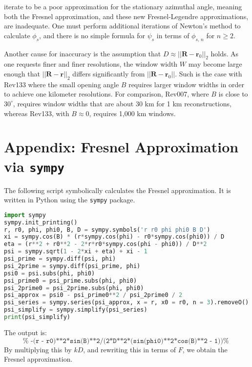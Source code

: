 \documentclass{article}
\theoremstyle{plain}
\begin{document}
        iterate to be a poor approximation for the stationary azimuthal angle,
        meaning both the Fresnel approximation, and these new Fresnel-Legendre
        approximations, are inadequate. One must perform additional iterations
        of Newton's method to calculate $\phi_{s}$, and there is no simple
        formula for $\psi_{s}$ in terms of $\phi_{s,\,n}$ for $n\geq{2}$.
        \par\hfill\par
        Another cause for inaccuracy is the assumption that
        $D\approx||\mathbf{R}-\mathbf{r}_{0}||_{2}$ holds. As one requests
        finer and finer resolutions, the window width $W$ may become large
        enough that $||\mathbf{R}-\mathbf{r}||_{2}$ differs significantly from
        $||\mathbf{R}-\mathbf{r}_{0}||$. Such is the case with Rev133 where the
        small opening angle $B$ requires larger window widths in order to
        achieve one kilometer resolutions. For comparison, Rev007, where $B$ is
        close to $30^{\circ}$, requires window widths that are about 30 km for
        1 km reconstructions, whereas Rev133, with $B\approx{0}$, requires
        1,000 km windows.
    \setcounter{secnumdepth}{0}
    \section{Appendix: Fresnel Approximation via \texttt{sympy}}
        The following script symbolically calculates the Fresnel approximation.
        It is written in Python using the \texttt{sympy} package.
        \begin{lstlisting}[language = Python]
import sympy
sympy.init_printing()
r, r0, phi, phi0, B, D = sympy.symbols('r r0 phi phi0 B D')
xi = sympy.cos(B) * (r*sympy.cos(phi) - r0*sympy.cos(phi0)) / D
eta = (r**2 + r0**2 - 2*r*r0*sympy.cos(phi - phi0)) / D**2
psi = sympy.sqrt(1 - 2*xi + eta) + xi - 1
psi_prime = sympy.diff(psi, phi)
psi_2prime = sympy.diff(psi_prime, phi)
psi0 = psi.subs(phi, phi0)
psi_prime0 = psi_prime.subs(phi, phi0)
psi_2prime0 = psi_2prime.subs(phi, phi0)
psi_approx = psi0 - psi_prime0**2 / psi_2prime0 / 2
psi_series = sympy.series(psi_approx, x = r, x0 = r0, n = 3).removeO()
psi_simplify = sympy.simplify(psi_series)
print(psi_simplify)
        \end{lstlisting}
        The output is:
        \begin{equation}
            \texttt{%
                -(r - r0)**2*sin(B)**2/(2*D**2*(sin(phi0)**2*cos(B)**2 - 1))%
            }
        \end{equation}
        By multiplying this by $kD$, and rewriting this in terms of $F$,
        we obtain the Fresnel approximation.
\end{document}
